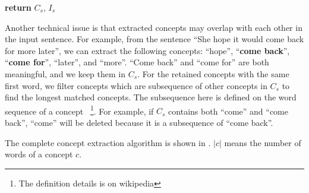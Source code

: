 \begin{algorithm}[H]
\begin{algorithmic}[1]
      \EndFor
     \EndFor
  \State \textbf{return} {$C_s$, $I_s$ }
  \EndProcedure
\end{algorithmic}
\end{algorithm}


Another technical issue is that extracted concepts may overlap with 
each other in the input sentence. For example, from the sentence 
``She hope it would come back for more later'', we can extract the following
concepts: ``hope'', ``\textbf{come back}'', ``\textbf{come for}'', ``later'', 
and ``more''. ``Come back'' and ``come for'' are both meaningful, and we keep 
them in $C_s$. For the retained concepts with the same first word, 
we filter concepts which are subsequence of
other concepts in $C_s$ to find the longest matched concepts.
 The subsequence here is defined on the word sequence of a concept
 ~\footnote{The definition details is on wikipedia}.
For example, if $C_s$ contains both ``come'' and ``come back'', 
``come'' will be deleted because it is a subsequence of ``come back''. 

The complete concept extraction algorithm is shown 
in . $|c|$ means the number of words
of a concept $c$. 

